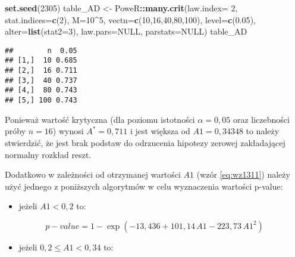 \documentclass[polish,]{book}
\newenvironment{Shaded}{\begin{snugshade}}{\end{snugshade}}
\newcommand{\DataTypeTok}[1]{\textcolor[rgb]{0.13,0.29,0.53}{#1}}
\newcommand{\DecValTok}[1]{\textcolor[rgb]{0.00,0.00,0.81}{#1}}
\newcommand{\FloatTok}[1]{\textcolor[rgb]{0.00,0.00,0.81}{#1}}
\newcommand{\KeywordTok}[1]{\textcolor[rgb]{0.13,0.29,0.53}{\textbf{#1}}}
\newcommand{\NormalTok}[1]{#1}
\newcommand{\OperatorTok}[1]{\textcolor[rgb]{0.81,0.36,0.00}{\textbf{#1}}}
\newcommand{\OtherTok}[1]{\textcolor[rgb]{0.56,0.35,0.01}{#1}}
\newcommand{\StringTok}[1]{\textcolor[rgb]{0.31,0.60,0.02}{#1}}
\providecommand{\tightlist}{%
  \setlength{\itemsep}{0pt}\setlength{\parskip}{0pt}}
\begin{document}
\begin{Shaded}
\begin{Highlighting}[]
\KeywordTok{set.seed}\NormalTok{(}\DecValTok{2305}\NormalTok{)}
\NormalTok{table_AD <-}\StringTok{ }\NormalTok{PoweR}\OperatorTok{::}\KeywordTok{many.crit}\NormalTok{(}\DataTypeTok{law.index=} \DecValTok{2}\NormalTok{, }\DataTypeTok{stat.indices=}\KeywordTok{c}\NormalTok{(}\DecValTok{2}\NormalTok{), }\DataTypeTok{M=}\DecValTok{10}\OperatorTok{^}\DecValTok{5}\NormalTok{,}
                             \DataTypeTok{vectn=}\KeywordTok{c}\NormalTok{(}\DecValTok{10}\NormalTok{,}\DecValTok{16}\NormalTok{,}\DecValTok{40}\NormalTok{,}\DecValTok{80}\NormalTok{,}\DecValTok{100}\NormalTok{),}
                             \DataTypeTok{level=}\KeywordTok{c}\NormalTok{(}\FloatTok{0.05}\NormalTok{),}
                             \DataTypeTok{alter=}\KeywordTok{list}\NormalTok{(}\DataTypeTok{stat2=}\DecValTok{3}\NormalTok{), }\DataTypeTok{law.pars=}\OtherTok{NULL}\NormalTok{, }\DataTypeTok{parstats=}\OtherTok{NULL}\NormalTok{)}
\NormalTok{table_AD}
\end{Highlighting}
\end{Shaded}

\begin{verbatim}
##        n  0.05
## [1,]  10 0.685
## [2,]  16 0.711
## [3,]  40 0.737
## [4,]  80 0.743
## [5,] 100 0.743
\end{verbatim}

Ponieważ wartość krytyczna (dla poziomu istotności \(\alpha = 0,05\) oraz liczebności próby \(n=16\)) wynosi \(A^* = 0,711\) i jest większa od \(A1 = 0,34348\) to należy stwierdzić, że jest brak
podstaw do odrzucenia hipotezy zerowej zakładającej normalny rozkład reszt.

Dodatkowo w zależności od otrzymanej wartości \(A1\) (wzór \eqref{eq:wz1311}) należy użyć jednego z poniższych algorytmów w celu wyznaczenia wartości p-value:

\begin{itemize}
\tightlist
\item
  jeżeli \(A1 < 0,2\) to:
\end{itemize}

\begin{equation}
p-value=1-\exp(-13,436+101,14\,A1-223,73\,A1^2)
\label{eq:wz1312a}
\end{equation}

\begin{itemize}
\tightlist
\item
  jeżeli \(0,2\leq A1<0,34\) to:
\end{itemize}
\end{document}
